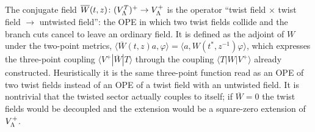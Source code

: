 \begin{physics}
The conjugate field $\overline W(t,z)\colon(V_{\Lambda}^{T})^{+}\to V_{\Lambda}^{+}$ is the operator ``twist field $\times$ twist field $\to$ untwisted field'': the OPE in which two twist fields collide and the branch cuts cancel to leave an ordinary field. It is defined as the adjoint of $W$ under the two-point metrics, $\langle\overline W(t,z)a,\varphi\rangle=\langle a,W(t^*,z^{-1})\varphi\rangle$, which expresses the three-point coupling $\langle V^+|\overline W|T\rangle$ through the coupling $\langle T|W|V^+\rangle$ already constructed. Heuristically it is the same three-point function read as an OPE of two twist fields instead of an OPE of a twist field with an untwisted field. It is nontrivial that the twisted sector actually couples to itself; if $\overline W=0$ the twist fields would be decoupled and the extension would be a square-zero extension of $V_{\Lambda}^{+}$.
\end{physics}

